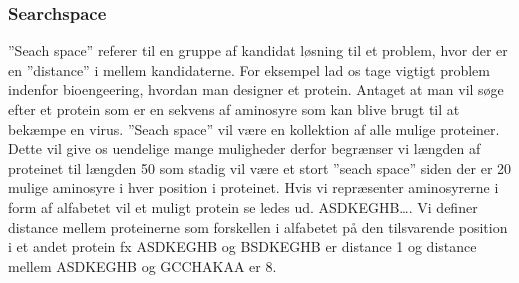 \subsubsection{Searchspace}

”Seach space” referer til en gruppe af kandidat løsning til et problem, hvor der er en ”distance” i mellem kandidaterne. For eksempel lad os tage vigtigt problem indenfor bioengeering, hvordan man designer et protein. Antaget at man vil søge efter et protein som er en sekvens af aminosyre som kan blive brugt til at bekæmpe en virus. ”Seach space” vil være en kollektion af alle mulige proteiner. Dette vil give os uendelige mange muligheder derfor begrænser vi længden af proteinet til længden 50 som stadig vil være et stort ”seach space” siden der er 20 mulige aminosyre i hver position i proteinet. Hvis vi repræsenter aminosyrerne i form af alfabetet vil et muligt protein se ledes ud. 
ASDKEGHB…. Vi definer distance mellem proteinerne som forskellen i alfabetet på den tilsvarende position i et andet protein fx ASDKEGHB og BSDKEGHB er distance 1 og distance mellem ASDKEGHB og GCCHAKAA er 8.
